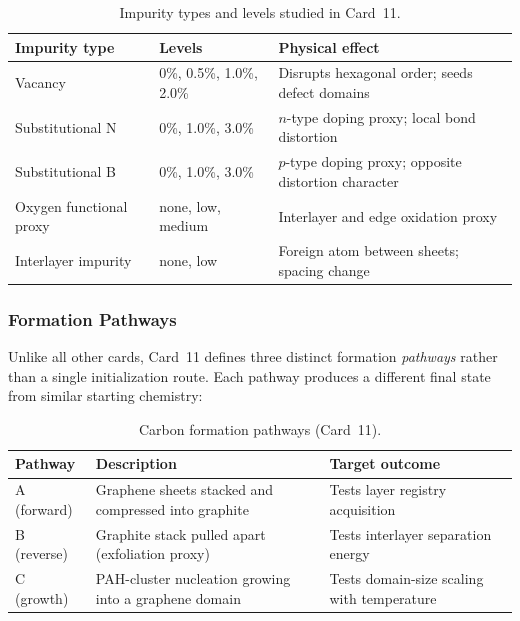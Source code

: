 \documentclass[12pt]{article}
\begin{document}
\begin{table}[H]
\centering
\caption{Impurity types and levels studied in Card~11.}
\label{tab:graphene_impurities}
\begin{tabular}{p{}p{}p{}}
\toprule
\textbf{Impurity type} & \textbf{Levels} & \textbf{Physical effect} \\
\midrule
Vacancy                  & 0\%, 0.5\%, 1.0\%, 2.0\%  & Disrupts hexagonal order; seeds defect domains \\
Substitutional N         & 0\%, 1.0\%, 3.0\%         & $n$-type doping proxy; local bond distortion \\
Substitutional B         & 0\%, 1.0\%, 3.0\%         & $p$-type doping proxy; opposite distortion character \\
Oxygen functional proxy  & none, low, medium          & Interlayer and edge oxidation proxy \\
Interlayer impurity      & none, low                  & Foreign atom between sheets; spacing change \\
\bottomrule
\end{tabular}
\end{table}

\subsubsection*{Formation Pathways}

Unlike all other cards, Card~11 defines three distinct formation
\emph{pathways} rather than a single initialization route.
Each pathway produces a different final state from similar starting chemistry:

\begin{table}[H]
\centering
\caption{Carbon formation pathways (Card~11).}
\label{tab:graphene_pathways}
\begin{tabular}{p{}p{}p{}}
\toprule
\textbf{Pathway} & \textbf{Description} & \textbf{Target outcome} \\
\midrule
A (forward)  & Graphene sheets stacked and compressed into graphite & Tests layer registry acquisition \\
B (reverse)  & Graphite stack pulled apart (exfoliation proxy)       & Tests interlayer separation energy \\
C (growth)   & PAH-cluster nucleation growing into a graphene domain & Tests domain-size scaling with temperature \\
\bottomrule
\end{tabular}
\end{table}
\end{document}
